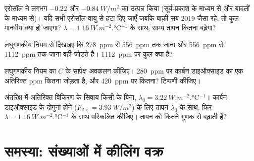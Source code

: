 \begin{exercise}[$\star\star\star$]\label{exo:g12:climate-change:12}
एरोसॉल ने लगभग $-0.22$ और $\qty{-0.84}{W/m^2}$ का  उत्पन्न किया
(सूर्य-प्रकाश के माध्यम से और बादलों के माध्यम से)। यदि सभी एरोसॉल वायु से हटा दिए
जाएँ जबकि बाक़ी सब 2019 जैसा रहे, तो कुल मानवीय
 क्या हो जाएगा? $\lambda = \qty{1.16}{W.m^{-2}.\degreeCelsius^{-1}}$ के साथ,
साम्य तापन कितना बढ़ेगा?
\end{exercise}

\begin{exercise}[$\star\star\star$]\label{exo:g12:climate-change:13}
लघुगणकीय नियम से दिखाइए कि \qty{278}{ppm} से
\qty{556}{ppm} तक जाना और \qty{556}{ppm} से \qty{1112}{ppm} तक जाना वही
 जोड़ते हैं। \qty{1112}{ppm} पर कुल  क्या है?
\end{exercise}

\begin{exercise}[$\star\star\star$]\label{exo:g12:climate-change:14}
लघुगणकीय नियम का $C$ के सापेक्ष अवकलन कीजिए। \qty{280}{ppm} पर कार्बन डाइऑक्साइड का
एक अतिरिक्त ppm कितना  जोड़ता है, और
\qty{420}{ppm} पर कितना? टिप्पणी कीजिए।
\end{exercise}

\begin{exercise}[$\star\star\star$]\label{exo:g12:climate-change:15}
अंतरिक्ष में अतिरिक्त विकिरण के सिवाय किसी  के बिना,
$\lambda_0 = \qty{3.22}{W.m^{-2}.\degreeCelsius^{-1}}$। कार्बन डाइऑक्साइड के दोगुना होने
($F_{2\times} = \qty{3.93}{W/m^2}$) के लिए तापन
$\lambda_0$ के साथ, फिर $\lambda = \qty{1.16}{W.m^{-2}.\degreeCelsius^{-1}}$ के साथ परिकलित कीजिए।
 तापन को कितने गुणक से बढ़ाती हैं?
\end{exercise}

\section{समस्या: संख्याओं में कीलिंग वक्र}

